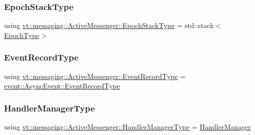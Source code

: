 \mbox{\label{structvt_1_1messaging_1_1_active_messenger_a746358029c37dabf2b4c8ad26642aee9}} 
\subsubsection{\texorpdfstring{Epoch\+Stack\+Type}{EpochStackType}}
{\footnotesize\ttfamily using \hyperlink{structvt_1_1messaging_1_1_active_messenger_a746358029c37dabf2b4c8ad26642aee9}{vt\+::messaging\+::\+Active\+Messenger\+::\+Epoch\+Stack\+Type} =  std\+::stack$<$\hyperlink{namespacevt_a985a5adf291c34a3ca263b3378388236}{Epoch\+Type}$>$}

\mbox{\label{structvt_1_1messaging_1_1_active_messenger_aed736a2b2eaa0f96971a4f0be3fe0a25}} 
\subsubsection{\texorpdfstring{Event\+Record\+Type}{EventRecordType}}
{\footnotesize\ttfamily using \hyperlink{structvt_1_1messaging_1_1_active_messenger_aed736a2b2eaa0f96971a4f0be3fe0a25}{vt\+::messaging\+::\+Active\+Messenger\+::\+Event\+Record\+Type} =  \hyperlink{structvt_1_1event_1_1_async_event_a5b4ef37db6e5962fdc0e6e0e56e74bc1}{event\+::\+Async\+Event\+::\+Event\+Record\+Type}}

\mbox{\label{structvt_1_1messaging_1_1_active_messenger_ac7e9165df6550ea333f8eb018a5a0e60}} 
\subsubsection{\texorpdfstring{Handler\+Manager\+Type}{HandlerManagerType}}
{\footnotesize\ttfamily using \hyperlink{structvt_1_1messaging_1_1_active_messenger_ac7e9165df6550ea333f8eb018a5a0e60}{vt\+::messaging\+::\+Active\+Messenger\+::\+Handler\+Manager\+Type} =  \hyperlink{structvt_1_1_handler_manager}{Handler\+Manager}}

